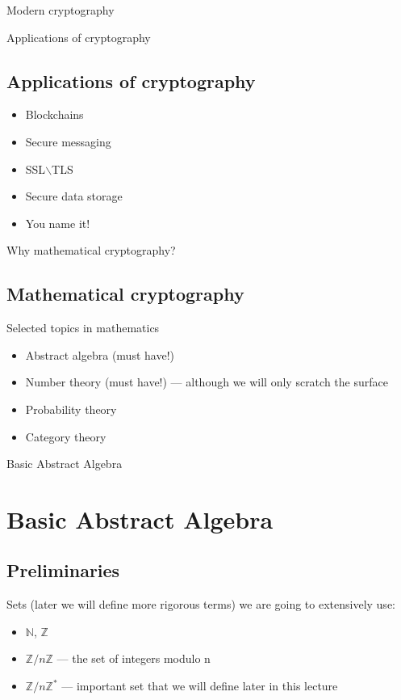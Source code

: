 \documentclass{beamer}
\begin{document}
\begin{frame}{Modern cryptography}
\begin{center}
\begin{minipage}{0.5\linewidth}
    \end{minipage}
    \end{center}
\end{frame}

\begin{frame}{Applications of cryptography}
    \subsection{Applications of cryptography}
    \begin{itemize}
        \item Blockchains
        \item Secure messaging
        \item SSL$\backslash$TLS
        \item Secure data storage
        \item You name it!
    \end{itemize}
\end{frame}

\begin{frame}{Why mathematical cryptography?}
    \subsection{Mathematical cryptography}
    Selected topics in mathematics
    \begin{itemize}
        \item Abstract algebra (must have!)
        \item Number theory (must have!) --- although we will only scratch the surface
        \item Probability theory
        \item Category theory
    \end{itemize}
\end{frame}


\begin{frame}{Basic Abstract Algebra}
    \section{Basic Abstract Algebra}
    \subsection{Preliminaries}
    Sets (later we will define more rigorous terms) we are going to extensively use:
    \begin{itemize}
        \item $\mathbb{N}$, $\mathbb{Z}$
        \item $\mathbb{Z} / n\mathbb{Z}$ --- the set of integers modulo n
        \item $\mathbb{Z} / n \mathbb{Z}^{*}$ --- important set that we will define later in this lecture
    \end{itemize} 
\end{frame}
\end{document}
